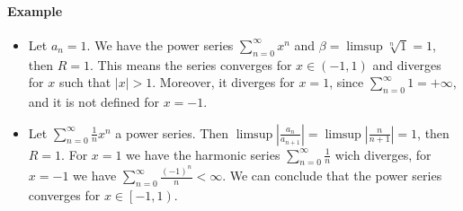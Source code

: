 \documentclass{article}
\newcommand{\DS}{\displaystyle}
\newcommand{\abs}[1]{\left|#1\right|}
\newcommand{\pseries}[1]{\sum_{n=0}^\infty #1}
\newcommand{\intco}[1]{\left[#1\right)}
\newcommand{\intoo}[1]{\left(#1\right)}
\newcommand{\Example}{\paragraph{Example}}
\begin{document}
  \Example
  \begin{itemize}
    \item %
    Let $a_n = 1$. We have the power series $\DS \pseries{x^n}$ and $\beta =
    \limsup \sqrt[n]{1} = 1$, then $R = 1$. This means the series converges for
    $x \in \intoo{-1,1}$ and diverges for $x$ such that $|x| > 1$. Moreover, it
    diverges for $x = 1$, since $\DS \pseries{1} = +\infty$, and it is not
    defined for $x = -1$.

    \item %
    Let $\DS \pseries{\frac{1}{n}x^n}$ a power series. Then $\limsup
    \abs{\frac{a_n}{a_{n+1}}} = \limsup \abs{\frac{n}{n+1}} = 1$, then $R = 1$.
    For $x = 1$ we have the harmonic series $\DS \pseries{\frac{1}{n}}$ wich
    diverges, for $x = -1$ we have $\DS \pseries{\frac{(-1)^n}{n}} < \infty$. We
    can conclude that the power series converges for $x \in \intco{-1,1}$.
  \end{itemize}

\end{document}
